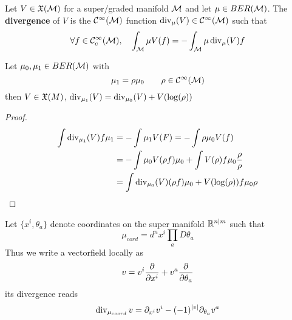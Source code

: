 \begin{rem}
  \begin{definition}
    Let $V \in \mathfrak{X}(\mathcal{M})$ for a super/graded manifold $\mathcal{M}$ and let $\mu \in BER(\mathcal{M})$. The \textbf{divergence} of $V$ is the $\mathcal{C}^{\infty}(\mathcal{M})$ function $\operatorname{div}_\mu(V) \in \mathcal{C}^{\infty}(\mathcal{M})$ such that
    $$ \forall f \in \mathcal{C}^{\infty}_c(\mathcal{M}), \quad \int_{\mathcal{M}} \mu V(f) = - \int_{\mathcal{M}} \mu \operatorname{div}_\mu(V) f$$
  \end{definition}

  \begin{lem}
    Let $\mu_0, \mu_1 \in BER(\mathcal{M})$ with
    $$ \mu_1 = \rho \mu_0 \quad \quad  \rho \in \mathcal{C}^{\infty}(\mathcal{M}) $$
    then $V \in \mathfrak{X}(M)$, $\operatorname{div}_{\mu_1}(V) = \operatorname{div}_{\mu_0}(V) + V(\log(\rho))$
  \begin{proof}~
    \begin{align}
      \int \operatorname{div}_{\mu_1}(V) f\mu_1 &= -\int \mu_1 V(F) = - \int \rho \mu_0 V(f)\\
      &= - \int \mu_0 V(\rho f) \mu_0 + \int V(\rho) f \mu_0 \frac{\rho}{\rho} \\
      &= \int \operatorname{div}_{\mu_0} (V) (\rho f) \mu_0 + V(\log(\rho)) f \mu_0 \rho
    \end{align}
  \end{proof}
  \end{lem}

  \begin{lem}
    Let $\{x^i, \theta_a\}$ denote coordinates on the super manifold $\mathbb{R}^{n|m}$ such that
    $$ \mu_{cord} = d^n x^i \prod_a D\theta_a $$
    Thus we write a vectorfield locally as
    $$ v = v^i \frac{\partial }{\partial x^i} + v^a \frac{\partial }{\partial \theta_a} $$
    its divergence reads
    $$ \operatorname{div}_{\mu_{coord}} v = \partial_{x^i} v^i - (-1)^{|v|} \partial_{\theta_a} v^a $$
  \end{lem}
\end{rem}





\newpage
